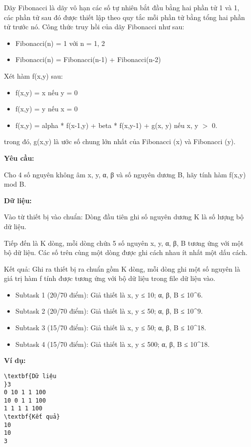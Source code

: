 

Dãy Fibonacci là dãy vô hạn các số tự nhiên bắt đầu bằng hai phần tử 1 và 1, các phần tử sau đó được thiết lập theo quy tắc mỗi phần tử bằng tổng hai phần tử trước nó. Công thức truy hồi của dãy Fibonacci như sau:
\begin{itemize}
	\item Fibonacci(n) = 1 với n = 1, 2
	\item Fibonacci(n) = Fibonacci(n-1) + Fibonacci(n-2)
\end{itemize}

Xét hàm f(x,y) sau:
\begin{itemize}
	\item f(x,y) = x nếu y = 0
	\item f(x,y) = y nếu x = 0
	\item f(x,y) = alpha * f(x-1,y) + beta * f(x,y-1) + g(x, y) nếu x, y $>$ 0.
\end{itemize}

trong đó, g(x,y) là ước số chung lớn nhất của Fibonacci (x) và Fibonacci (y).

\textbf{Yêu cầu:}

Cho 4 số nguyên không âm x, y, α, β và số nguyên dương B, hãy tính hàm f(x,y) mod B.

\textbf{Dữ liệu:}

Vào từ thiết bị vào chuẩn: Dòng đầu tiên ghi số nguyên dương K là số lượng bộ dữ liệu.

Tiếp đến là K dòng, mỗi dòng chứa 5 số nguyên x, y, α, β, B tương ứng với một bộ dữ liệu. Các số trên cùng một dòng được ghi cách nhau ít nhất một dấu cách.

Kết quả: Ghi ra thiết bị ra chuẩn gồm K dòng, mỗi dòng ghi một số nguyên là giá trị hàm f tính được tương ứng với bộ dữ liệu trong file dữ liệu vào.
\begin{itemize}
	\item Subtask 1 (20/70 điểm): Giả thiết là x, y ≤ 10; α, β, B ≤ 10\textasciicircum6.
	\item Subtask 2 (20/70 điểm): Giả thiết là x, y ≤ 50; α, β, B ≤ 10\textasciicircum9.
	\item Subtask 3 (15/70 điểm): Giả thiết là x, y ≤ 50; α, β, B ≤ 10\textasciicircum18.
	\item Subtask 4 (15/70 điểm): Giả thiết là x, y ≤ 500; α, β, B ≤ 10\textasciicircum18.
\end{itemize}

\textbf{Ví dụ:}
\begin{verbatim}
\textbf{Dữ liệu
}3
0 10 1 1 100
10 0 1 1 100
1 1 1 1 100
\textbf{Kết quả}
10
10
3

\end{verbatim}